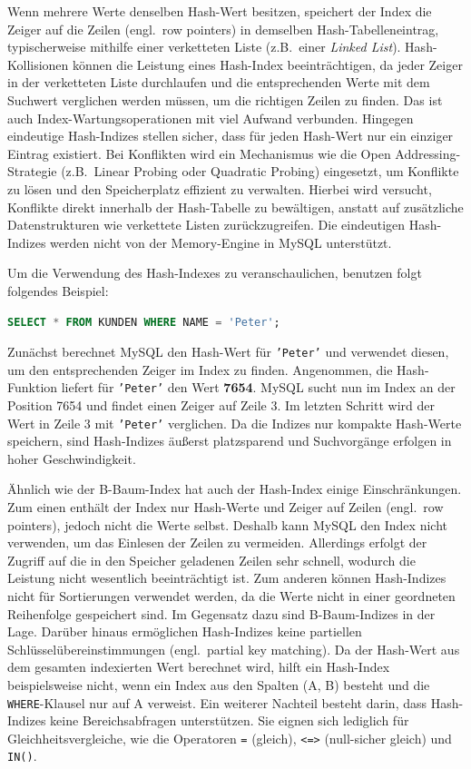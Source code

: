 Wenn mehrere Werte denselben Hash-Wert besitzen, speichert der Index die Zeiger auf die Zeilen (engl.\ row pointers) in demselben Hash-Tabelleneintrag, typischerweise mithilfe einer verketteten Liste (z.B.\ einer \textit{Linked List}).
Hash-Kollisionen können die Leistung eines Hash-Index beeinträchtigen, da jeder Zeiger in der verketteten Liste durchlaufen und die entsprechenden Werte mit dem Suchwert verglichen werden müssen, um die richtigen Zeilen zu finden.
Das ist auch Index-Wartungsoperationen mit viel Aufwand verbunden.
Hingegen eindeutige Hash-Indizes stellen sicher, dass für jeden Hash-Wert nur ein einziger Eintrag existiert.
Bei Konflikten wird ein Mechanismus wie die Open Addressing-Strategie (z.B.\ Linear Probing oder Quadratic Probing) eingesetzt, um Konflikte zu lösen und den Speicherplatz effizient zu verwalten.
Hierbei wird versucht, Konflikte direkt innerhalb der Hash-Tabelle zu bewältigen, anstatt auf zusätzliche Datenstrukturen wie verkettete Listen zurückzugreifen.
Die eindeutigen Hash-Indizes werden nicht von der Memory-Engine in MySQL unterstützt.

Um die Verwendung des Hash-Indexes zu veranschaulichen, benutzen folgt folgendes Beispiel:

\vspace{-5pt}
\begin{lstlisting}[language=SQL]
SELECT * FROM KUNDEN WHERE NAME = 'Peter';
\end{lstlisting}
\vspace{-8pt}

Zunächst berechnet MySQL den Hash-Wert für \texttt{'Peter'} und verwendet diesen, um den entsprechenden Zeiger im Index zu finden.
Angenommen, die Hash-Funktion liefert für \texttt{'Peter'} den Wert \textbf{7654}.
MySQL sucht nun im Index an der Position 7654 und findet einen Zeiger auf Zeile 3.
Im letzten Schritt wird der Wert in Zeile 3 mit \texttt{'Peter'} verglichen.
Da die Indizes nur kompakte Hash-Werte speichern, sind Hash-Indizes äußerst platzsparend und Suchvorgänge erfolgen in hoher Geschwindigkeit.

Ähnlich wie der B-Baum-Index hat auch der Hash-Index einige Einschränkungen.
Zum einen enthält der Index nur Hash-Werte und Zeiger auf Zeilen (engl.\ row pointers), jedoch nicht die Werte selbst.
Deshalb kann MySQL den Index nicht verwenden, um das Einlesen der Zeilen zu vermeiden.
Allerdings erfolgt der Zugriff auf die in den Speicher geladenen Zeilen sehr schnell, wodurch die Leistung nicht wesentlich beeinträchtigt ist.
Zum anderen können Hash-Indizes nicht für Sortierungen verwendet werden, da die Werte nicht in einer geordneten Reihenfolge gespeichert sind.
Im Gegensatz dazu sind B-Baum-Indizes in der Lage.
Darüber hinaus ermöglichen Hash-Indizes keine partiellen Schlüsselübereinstimmungen (engl.\ partial key matching).
Da der Hash-Wert aus dem gesamten indexierten Wert berechnet wird, hilft ein Hash-Index beispielsweise nicht, wenn ein Index aus den Spalten (A, B) besteht und die \texttt{WHERE}-Klausel nur auf A verweist.
Ein weiterer Nachteil besteht darin, dass Hash-Indizes keine Bereichsabfragen unterstützen.
Sie eignen sich lediglich für Gleichheitsvergleiche, wie die Operatoren \texttt{=} (gleich), \texttt{<=>} (null-sicher gleich) und \texttt{IN()}.

